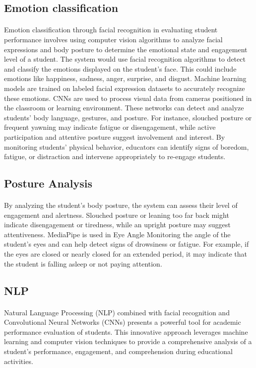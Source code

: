 \subsection{Emotion classification}
\paragraph{} Emotion classification through facial recognition in evaluating student performance involves using computer vision algorithms to analyze facial expressions and body posture to determine the emotional state and engagement level of a student. The system would use facial recognition algorithms to detect and classify the emotions displayed on the student's face. This could include emotions like happiness, sadness, anger, surprise, and disgust. Machine learning models are trained on labeled facial expression datasets to accurately recognize these emotions. CNNs are used to process visual data from cameras positioned in the classroom or learning environment. These networks can detect and analyze students' body language, gestures, and posture. For instance, slouched posture or frequent yawning may indicate fatigue or disengagement, while active participation and attentive posture suggest involvement and interest. By monitoring students' physical behavior, educators can identify signs of boredom, fatigue, or distraction and intervene appropriately to re-engage students.

\subsection{Posture Analysis}
\paragraph{} By analyzing the student's body posture, the system can assess their level of engagement and alertness. Slouched posture or leaning too far back might indicate disengagement or tiredness, while an upright posture may suggest attentiveness. MediaPipe is used in Eye Angle Monitoring the angle of the student's eyes and can help detect signs of drowsiness or fatigue. For example, if the eyes are closed or nearly closed for an extended period, it may indicate that the student is falling asleep or not paying attention.

\subsection{NLP}
\paragraph{} Natural Language Processing (NLP) combined with facial recognition and Convolutional Neural Networks (CNNs) presents a powerful tool for academic performance evaluation of students. This innovative approach leverages machine learning and computer vision techniques to provide a comprehensive analysis of a student's performance, engagement, and comprehension during educational activities.

